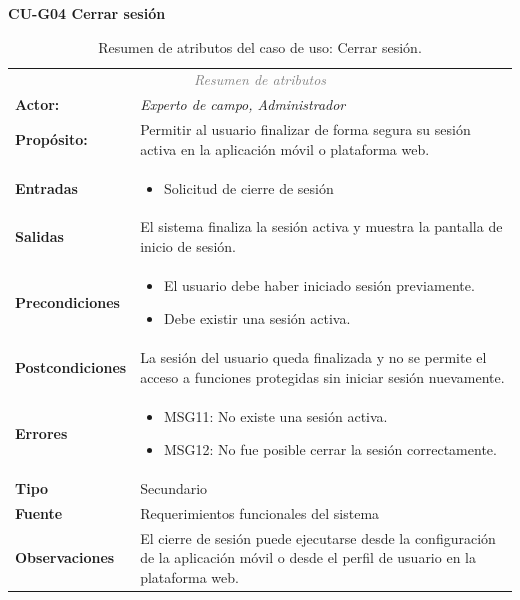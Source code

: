 \textbf{CU-G04 Cerrar sesión} 
\begin{table}[H]
\centering
\renewcommand{\arraystretch}{1.2}

\begin{tabular}{|l|p{10cm}|}
\hline
\rowcolor{black}
\multicolumn{2}{|l|}{\color{white} \textbf{Caso de uso:} CU-G04 Cerrar sesión} \\ \hline

\multicolumn{2}{|c|}{\textit{\textcolor{gray}{Resumen de atributos}}} \\ \hline

\textbf{Actor:} & \textit{Experto de campo, Administrador} \\ \hline

\textbf{Propósito:} & Permitir al usuario finalizar de forma segura su sesión activa en la aplicación móvil o plataforma web. \\ \hline

\textbf{Entradas} & 
\begin{itemize}
    \item Solicitud de cierre de sesión
\end{itemize} \\ \hline

\textbf{Salidas} & 
El sistema finaliza la sesión activa y muestra la pantalla de inicio de sesión. \\ \hline

\textbf{Precondiciones} & 
\begin{itemize}
    \item El usuario debe haber iniciado sesión previamente.
    \item Debe existir una sesión activa.
\end{itemize} \\ \hline

\textbf{Postcondiciones} & 
La sesión del usuario queda finalizada y no se permite el acceso a funciones protegidas sin iniciar sesión nuevamente. \\ \hline

\textbf{Errores} & 
\begin{itemize}
    \item MSG11: No existe una sesión activa.
    \item MSG12: No fue posible cerrar la sesión correctamente.
\end{itemize} \\ \hline

\textbf{Tipo} & Secundario \\ \hline

\textbf{Fuente} & Requerimientos funcionales del sistema \\ \hline

\textbf{Observaciones} & 
El cierre de sesión puede ejecutarse desde la configuración de la aplicación móvil o desde el perfil de usuario en la plataforma web. \\ \hline

\end{tabular}
\caption{Resumen de atributos del caso de uso: Cerrar sesión.}
\label{tab:cuG04CerrarSesion}
\end{table}

